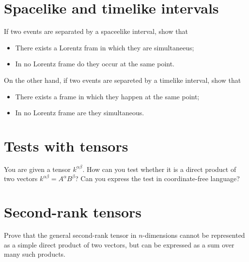 \documentclass[a4paper, 11pt, oneside]{impression}
\begin{document}


\newpage

\chapter{Spacelike and timelike intervals}\label{quest: ten}

\begin{exercise}{}
    If two events are separated by a spaceelike interval, show that
    \begin{itemize}
        \item There exists a Lorentz fram in which they are simultaneeus;
        \item In no Lorentz frame do they occur at the same point.
    \end{itemize}
    On the other hand, if two events are separeted by a timelike interval, show that
    \begin{itemize}
        \item There exists a frame in which they happen at the same point;
        \item In no Lorentz frame are they simultaneous.
    \end{itemize}
\end{exercise}



\newpage

\chapter{Tests with tensors}\label{quest: eleven}

\begin{exercise}{}
    You are given a tensor $k^{\alpha\beta}$. How can you test whether it is a direct product of two vectors $k^{\alpha\beta} = A^{\alpha}B^{\beta}$? Can you express the test in coordinate-free language?
\end{exercise}



\newpage

\chapter{Second-rank tensors}\label{quest: twelve}

\begin{exercise}{}
    Prove that the general second-rank tensor in $n$-dimensions cannot be represented as a simple direct product of two vectors, but can be expressed as a sum over many such products.
\end{exercise}
\end{document}
